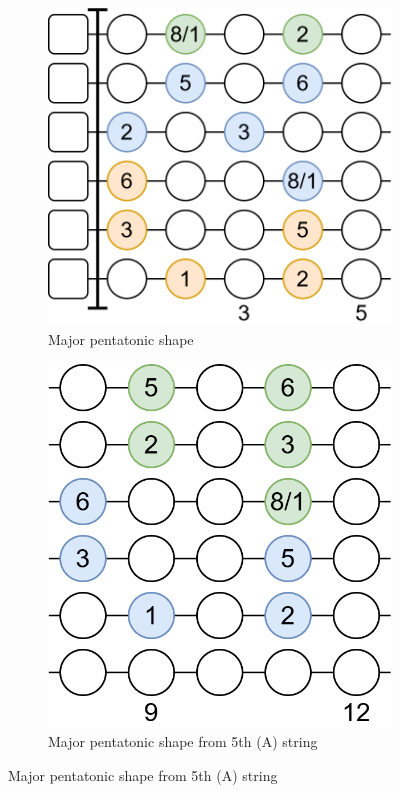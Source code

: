 \begin{figure}[h]
	\begin{subfigure}[b]{0.45\textwidth}
		\centering
		\includegraphics[height=0.175\textheight]{../../Images/guitar_major_pentatonic_standard.png}
		\caption{Major pentatonic shape}
		\label{fig:guitar_major_pentatonic_shape}
	\end{subfigure}
	\hfill
	\begin{subfigure}[b]{0.45\textwidth}
		\centering
		\includegraphics[height=0.175\textheight]{../../Images/guitar_major_pentatonic_standard_start_5th_string.png}
		\caption{Major pentatonic shape from 5th (A) string}
		\label{fig:guitar_major_pentatonic_shape_start_5th_string}
	\end{subfigure}
	

\end{figure}
